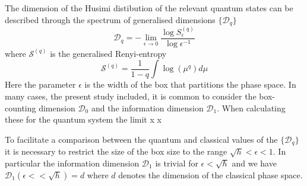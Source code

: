 \documentclass{iopart}
\newcommand{\Dfancy}{\mathcal{D}}
\newcommand{\Sfancy}{\mathcal{S}}
\begin{document}
The dimension of the Husimi distibution of the relevant quantum states can be described through the spectrum of generalised dimensions $\lbrace\mathcal{D}_{q}\rbrace$
\begin{equation}
	\mathcal{D}_{q}=-\lim_{\epsilon\to0} \frac{\log S_\epsilon^{(q)}}{\log \epsilon^{-1}}
\end{equation}
where $\Sfancy^{(q)}$ is the generalised Renyi-entropy
\begin{equation}
	\Sfancy^{(q)}=\frac{1}{1-q}\int \log\left(\mu^q\right)d\mu
\end{equation}
Here the parameter $\epsilon$ is the width of the box that partitions the phase space. In many cases, the present study included, it is common to consider the box-counting dimension $\Dfancy_0$ and the information dimension $\Dfancy_1$. When calculating these for the quantum system the limit x	x

To facilitate a comparison between the quantum and classical values of the $\lbrace \Dfancy_q \rbrace$ it is necessary to restrict the size of the box size to the range $\sqrt{h}<\epsilon<1$. In particular the information dimension $\Dfancy_1$ is trivial for $\epsilon<\sqrt{\hbar}$ and we have $\Dfancy_1(\epsilon<<\sqrt{h})=d$ where $d$ denotes the dimension of the classical phase space.



	
	
\end{document}
